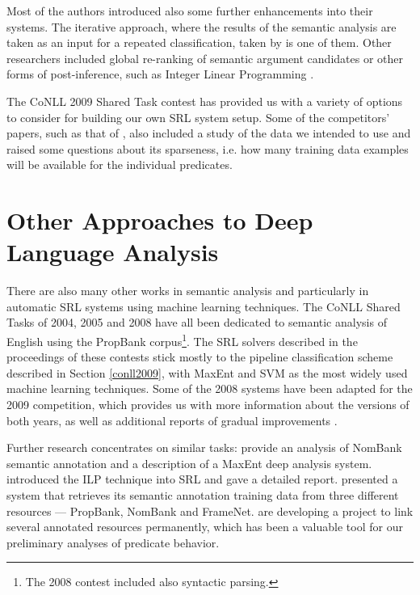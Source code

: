 \documentclass[12pt,notitlepage]{report}
\begin{document}
Most of the authors introduced also some further enhancements into their systems. The iterative approach, where the results of the semantic analysis are taken as an input for a repeated classification, taken by \citet{chen09} is one of them. Other researchers included global re-ranking of semantic argument candidates \citep{nugues09} or other forms of post-inference, such as Integer Linear Programming \citep{che09}.

The CoNLL 2009 Shared Task contest has provided us with a variety of options to consider for building our own SRL system setup. Some of the competitors' papers, such as that of \citet{zeman09}, also included a study of the data we intended to use and raised some questions about its sparseness, i.e. how many training data examples will be available for the individual predicates.

\section{Other Approaches to Deep Language Analysis}

There are also many other works in semantic analysis and particularly in automatic SRL systems using machine learning techniques. The CoNLL Shared Tasks of 2004, 2005 \citep{carreras04,carreras05} and 2008 \citep{surdeanu08} have all been dedicated to semantic analysis of English using the PropBank corpus\footnote{The 2008 contest included also syntactic parsing.}. The SRL solvers described in the proceedings of these contests stick mostly to the pipeline classification scheme described in Section \ref{conll2009}, with MaxEnt and SVM as the most widely used machine learning techniques. Some of the 2008 systems have been adapted for the 2009 competition, which provides us with more information about the versions of both years, as well as additional reports of gradual improvements \citep{che08,chen08}.

Further research concentrates on similar tasks: \citet{jiang06} provide an analysis of NomBank \citep{meyers04} semantic annotation and a description of a MaxEnt deep analysis system. \citet{punyakanok04} introduced the ILP technique into SRL and gave a detailed report. \citet{giuglea06} presented a system that retrieves its semantic annotation training data from three different resources --- PropBank, NomBank and FrameNet. \citet{loper07} are developing a project to link several annotated resources permanently, which has been a valuable tool for our preliminary analyses of predicate behavior. 
\end{document}

